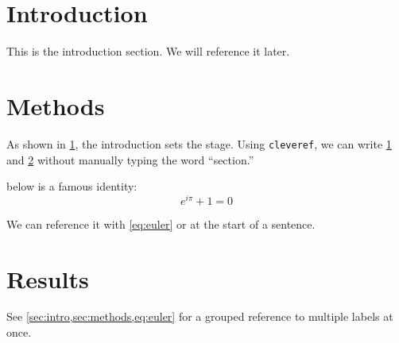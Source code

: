 \documentclass[11pt]{article}
\begin{document}
\section{Introduction}\label{sec:intro}
This is the introduction section. We will reference it later.

\section{Methods}\label{sec:methods}
As shown in \ref{sec:intro}, the introduction sets the stage.
Using \texttt{cleveref}, we can write \cref{sec:intro} and
\cref{sec:methods} without manually typing the word ``section.''

 below is a famous identity:
\begin{equation}\label{eq:euler}
  e^{i\pi} + 1 = 0
\end{equation}

We can reference it with \cref{eq:euler} or 
at the start of a sentence.

\section{Results}\label{sec:results}
See \cref{sec:intro,sec:methods,eq:euler} for a grouped reference
to multiple labels at once.
\end{document}
